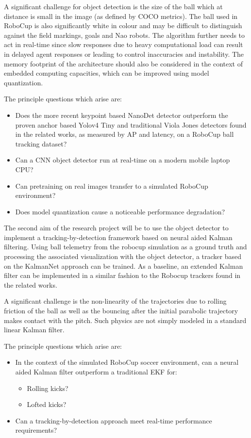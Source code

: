 \documentclass[a4paper,twoside,12pt]{report}
\begin{document}
A significant challenge for object detection is the size of the ball which at distance is small in the image (as defined by COCO metrics). The ball used in RoboCup is also significantly white in colour and may be difficult to distinguish against the field markings, goals and Nao robots. The algorithm further needs to act in real-time since slow responses due to heavy computational load can result in delayed agent responses or leading to control inaccuracies and instability. The memory footprint of the architecture should also be considered in the context of embedded computing capacities, which can be improved using model quantization.

The principle questions which arise are:
\begin{itemize}
    \item Does the more recent keypoint based NanoDet detector outperform the proven anchor based Yolov4 Tiny and traditional Viola Jones detectors found in the related works, as measured by AP and latency, on a RoboCup ball tracking dataset? 
    \item Can a CNN object detector run at real-time on a modern mobile laptop CPU?
    \item Can pretraining on real images transfer to a simulated RoboCup environment?
    \item Does model quantization cause a noticeable performance degradation? 
\end{itemize}

The second aim of the research project will be to use the object detector to implement a tracking-by-detection framework based on neural aided Kalman filtering. Using ball telemetry from the robocup simulation as a ground truth and processing the associated visualization with the object detector, a tracker based on the KalmanNet approach can be trained. As a baseline, an extended Kalman filter can be implemented in a similar fashion to the Robocup trackers found in the related works. 

A significant challenge is the non-linearity of the trajectories due to rolling friction of the ball as well as the bouncing after the initial parabolic trajectory makes contact with the pitch. Such physics are not simply modeled in a standard linear Kalman filter. 

The principle questions which arise are:
\begin{itemize}
    \item In the context of the simulated RoboCup soccer environment, can a neural aided Kalman filter outperform a traditional EKF for:
    \begin{itemize}
    	\item Rolling kicks?
    	\item Lofted kicks?
	\end{itemize}
	\item Can a tracking-by-detection approach meet real-time performance requirements?
\end{itemize}
\end{document}
